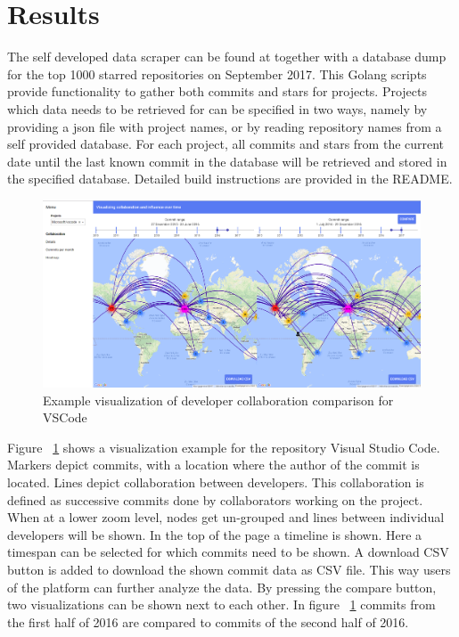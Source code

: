 \documentclass[acmtog, authorversion]{acmart}
\begin{document}
\section{Results}
The self developed data scraper can be found at \cite{githubvisualizerovertime} together with a database dump for the top 1000 starred repositories on September 2017.
This Golang scripts provide functionality to gather both commits and stars for projects.
Projects which data needs to be retrieved for can be specified in two ways, namely by providing a json file with project names, or by reading repository names from a self provided database. 
For each project, all commits and stars from the current date until the last known commit in the database will be retrieved and stored in the specified database. 
Detailed build instructions are provided in the README.
\begin{figure}
\includegraphics[scale=0.18]{images/vscode-compare.PNG}
\caption{Example visualization of developer collaboration comparison for VSCode}
\label{fig:collaboration}
\end{figure}

Figure ~\ref{fig:collaboration} shows a visualization example for the repository Visual Studio Code.
Markers depict commits, with a location where the author of the commit is located.
Lines depict collaboration between developers.
This collaboration is defined as successive commits done by collaborators working on the project.
When at a lower zoom level, nodes get un-grouped and lines between individual developers will be shown.
In the top of the page a timeline is shown. 
Here a timespan can be selected for which commits need to be shown. 
A download CSV button is added to download the shown commit data as CSV file.
This way users of the platform can further analyze the data.
By pressing the compare button, two visualizations can be shown next to each other. 
In figure  ~\ref{fig:collaboration} commits from the first half of 2016 are compared to commits of the second half of 2016.
\end{document}
